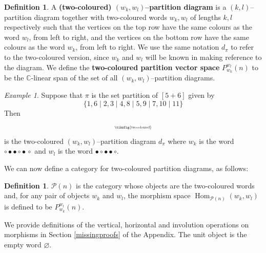 \documentclass{article}
\DeclareMathOperator{\Hom}{Hom}
\theoremstyle{plain}
\theoremstyle{definition}
\newtheorem{definition}[theorem]{Definition}
\theoremstyle{remark}
\newtheorem{example}[theorem]{Example}
\begin{document}
\begin{definition}
A \textbf{(two-coloured) $(w_k, w_l)$--partition diagram} is a $(k,l)$--partition diagram 
together with two-coloured words $w_k, w_l$ of lengths $k,l$ respectively such that
the vertices on the top row have the same colours as the word $w_l$, from left to right, and the vertices on the bottom row have the same colours as the word $w_k$, 
	from left to right.
We use the same notation $d_\pi$ to refer to the two-coloured version, since $w_k$ and $w_l$ will be known in making reference to the diagram.
We define the \textbf{two-coloured partition vector space} $P_{w_k}^{w_l}(n)$ to be the $\mathbb{C}$-linear span of the set of all $(w_k,w_l)$--partition diagrams.
\end{definition}

\begin{example} \label{twocolsetpart}
	Suppose that $\pi$ is the set partition of $[5 + 6]$ given by
\begin{equation} 
	\{1, 6 \mid 2, 3 \mid 4, 8 \mid 5, 9 \mid 7, 10 \mid 11\}
\end{equation}
Then 
	\begin{equation}
		\begin{aligned}
			\scalebox{0.5}{\tikzfig{twocoloured}}
		\end{aligned}
	\end{equation}
	is the two-coloured $(w_k, w_l)$--partition diagram $d_\pi$
where
$w_k$ is the word 
$\circ \bullet \bullet \circ \bullet \, \circ$ and
$w_l$ is the word
$\bullet \circ \bullet \bullet \circ$.
\end{example}

We can now define a category for two-coloured partition diagrams, as follows:

\begin{definition} \label{cattwopart}
	$\mathcal{P}(n)$
	is the category whose objects are the two-coloured words
	and, for any pair of objects $w_k$ and $w_l$,
	the morphism space $\Hom_{\mathcal{P}(n)}(w_k,w_l)$
	is defined to be $P_{w_k}^{w_l}(n)$.

	We provide definitions of the vertical, horizontal and involution
	operations on morphisms in Section \ref{missingproofs} of the Appendix.
	The unit object is the empty word $\varnothing$.
\end{definition}
\end{document}
